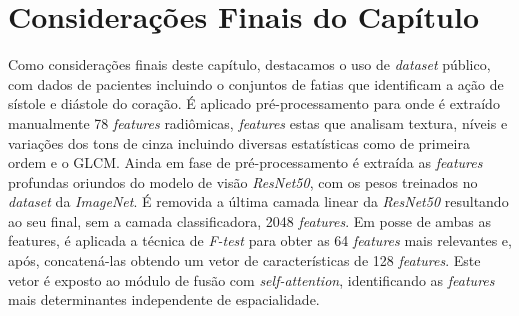 


\section{Considerações Finais do Capítulo}
\label{sec:cap4_consideracoes_finais}

Como considerações finais deste capítulo, destacamos o uso de \textit{dataset} público, com dados de pacientes incluindo o conjuntos de fatias que identificam a ação de sístole e diástole do coração. É aplicado pré-processamento para onde é extraído manualmente 78 \textit{features} radiômicas, \textit{features} estas que analisam textura, níveis e variações dos tons de cinza incluindo diversas estatísticas como de primeira ordem e o \gls{GLCM}. Ainda em fase de pré-processamento é extraída as \textit{features} profundas oriundos do modelo de visão \textit{ResNet50}, com os pesos treinados no \textit{dataset} da \textit{ImageNet}. É removida a última camada linear da \textit{ResNet50} resultando ao seu final, sem a camada classificadora, 2048 \textit{features}. Em posse de ambas as features, é aplicada a técnica de \textit{F-test} para obter as 64 \textit{features} mais relevantes e, após, concatená-las obtendo um vetor de características de 128 \textit{features}. Este vetor é exposto ao módulo de fusão com \textit{self-attention}, identificando as \textit{features} mais determinantes independente de espacialidade. 